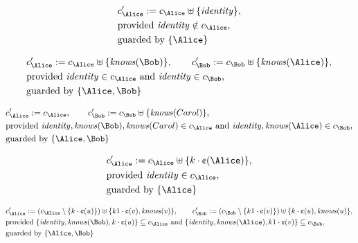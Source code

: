\begin{align*}
&
c'_
{
\Alice
}
 := 
c_
{
\Alice
}
 \uplus 
\{
\mathit{
identity
}
\}
,\\
&
\text{provided } 
\mathit{
identity
}
 \notin c_
{
\Alice
}
,\\
&
\text{guarded by } \{
\Alice
\}
\end{align*}

\begin{align*}
&
c'_
{
\Alice
}
 := 
c_
{
\Alice
}
 \uplus 
\{
\mathit{
knows
}
(
\Bob
)
\}
, \qquad 
c'_
{
\Bob
}
 := 
c_
{
\Bob
}
 \uplus 
\{
\mathit{
knows
}
(
\Alice
)
\}
,\\
&
\text{provided } 
\mathit{
identity
}
 \in c_
{
\Alice
}
 \text{ and } 
\mathit{
identity
}
 \in c_
{
\Bob
}
,\\
&
\text{guarded by } \{
\Alice
,
\Bob
\}
\end{align*}

\begin{align*}
&
c'_
{
\Alice
}
 := 
c_
{
\Alice
}
, \qquad 
c'_
{
\Bob
}
 := 
c_
{
\Bob
}
 \uplus 
\{
\mathit{
knows
}
(
Carol
)
\}
,\\
&
\text{provided } 
\mathit{
identity
}
,
\mathit{
knows
}
(
\Bob
)
,
\mathit{
knows
}
(
Carol
)
 \in c_
{
\Alice
}
 \text{ and } 
\mathit{
identity
}
,
\mathit{
knows
}
(
\Alice
)
 \in c_
{
\Bob
}
,\\
&
\text{guarded by } \{
\Alice
,
\Bob
\}
\end{align*}

\begin{align*}
&
c'_
{
\Alice
}
 := 
c_
{
\Alice
}
 \uplus 
\{
k
\cdot
\text{\textcent}
(
\Alice
)
\}
,\\
&
\text{provided } 
\mathit{
identity
}
 \in c_
{
\Alice
}
,\\
&
\text{guarded by } \{
\Alice
\}
\end{align*}

\begin{align*}
&
c'_
{
\Alice
}
 := 
(c_
{
\Alice
}
 \setminus 
\{
k
\cdot
\text{\textcent}
(
u
)
\}
) \uplus 
\{
k1
\cdot
\text{\textcent}
(
v
)
,
\mathit{
knows
}
(
v
)
\}
, \qquad 
c'_
{
\Bob
}
 := 
(c_
{
\Bob
}
 \setminus 
\{
k1
\cdot
\text{\textcent}
(
v
)
\}
) \uplus 
\{
k
\cdot
\text{\textcent}
(
u
)
,
\mathit{
knows
}
(
u
)
\}
,\\
&
\text{provided } 
\{
\mathit{
identity
}
,
\mathit{
knows
}
(
\Bob
)
,
k
\cdot
\text{\textcent}
(
u
)
\}
 \subseteq c_
{
\Alice
}
 \text{ and } 
\{
\mathit{
identity
}
,
\mathit{
knows
}
(
\Alice
)
,
k1
\cdot
\text{\textcent}
(
v
)
\}
 \subseteq c_
{
\Bob
}
,\\
&
\text{guarded by } \{
\Alice
,
\Bob
\}
\end{align*}

